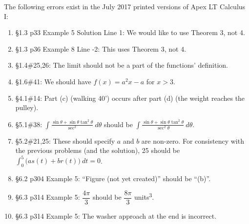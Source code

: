 \documentclass{amsart}
\newcommand{\ds}{\displaystyle}
\begin{document}
The following errors exist in the July 2017 printed versions of Apex LT Calculus I:
\begin{enumerate}
\item \S1.3 p33 Example 5 Solution Line 1: We would like to use Theorem 3, not 4.
\item \S1.3 p36 Example 8 Line -2: This uses Theorem 3, not 4.
\item \S1.4\#25,26: The limit should not be a part of the functions' definition.
\item \S1.6\#41: We should have $f(x)=a^2x-a$ for $x>3$.
\item \S4.1\#14: Part (c) (walking 40') occurs after part (d) (the weight reaches the pulley).
\item \S5.1\#38: $\ds \int \frac{\sin\theta+\sin\theta\tan^2\theta}{\sec^2}\ d\theta$ should be $\ds \int \frac{\sin\theta+\sin\theta\tan^2\theta}{\sec^2\theta}\ d\theta$.
\item \S5.2\#21,25: These should specify $a$ and $b$ are non-zero.  For consistency with the previous problems (and the solution), 25 should be $\ds\int_0^5 \big(as(t)+br(t)\big) \ dt=0$.
\item \S6.2 p304 Example 5: ``Figure (not yet created)'' should be ``(b)''.
\item \S6.3 p314 Example 5: $\dfrac{4\pi}3$ should be $\dfrac{8\pi}3$ units\textsuperscript3.
\item \S6.3 p314 Example 5: The washer approach at the end is incorrect.
\label{2017-07Iplus}
\end{enumerate}

\end{document}
